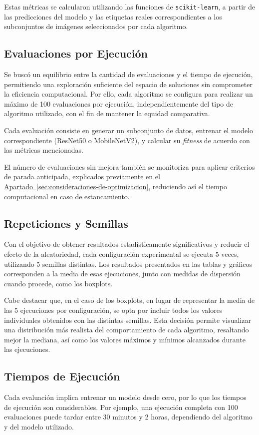 Estas métricas se calcularon utilizando las funciones de \texttt{scikit-learn}, a partir de las predicciones del modelo y las etiquetas
reales correspondientes a los subconjuntos de imágenes seleccionados por cada algoritmo.

\subsection{Evaluaciones por Ejecución}\label{sec:evaluaciones-por-ejecucion}
Se buscó un equilibrio entre la cantidad de evaluaciones y el tiempo de ejecución, permitiendo una exploración suficiente del espacio de soluciones sin comprometer la eficiencia computacional.
Por ello, cada algoritmo se configura para realizar un máximo de 100 evaluaciones por ejecución,
independientemente del tipo de algoritmo utilizado, con el fin de mantener la equidad comparativa.

Cada evaluación consiste en generar un subconjunto de datos, entrenar el modelo correspondiente (ResNet50 o MobileNetV2),
y calcular su \textit{fitness} de acuerdo con las métricas mencionadas.

El número de evaluaciones sin mejora también se monitoriza para aplicar criterios de parada anticipada,
explicados previamente en el \hyperref[sec:consideraciones-de-optimizacion]{Apartado~\ref*{sec:consideraciones-de-optimizacion}},
reduciendo así el tiempo computacional en caso de estancamiento.

\subsection{Repeticiones y Semillas}\label{sec:repeticiones-y-semillas}
Con el objetivo de obtener resultados estadísticamente significativos y reducir el efecto de la aleatoriedad,
cada configuración experimental se ejecuta 5 veces, utilizando 5 semillas distintas.
Los resultados presentados en las tablas y gráficos corresponden a la media de esas ejecuciones,
junto con medidas de dispersión cuando procede, como los boxplots.

Cabe destacar que, en el caso de los boxplots, en lugar de representar la media de las 5 ejecuciones por configuración,
se opta por incluir todos los valores individuales obtenidos con las distintas semillas.
Esta decisión permite visualizar una distribución más realista del comportamiento de cada algoritmo,
resaltando mejor la mediana, así como los valores máximos y mínimos alcanzados durante las ejecuciones.

\subsection{Tiempos de Ejecución}\label{sec:tiempos-de-ejecucion}
Cada evaluación implica entrenar un modelo desde cero, por lo que los tiempos de ejecución son considerables.
Por ejemplo, una ejecución completa con 100 evaluaciones puede tardar entre 30 minutos y 2 horas,
dependiendo del algoritmo y del modelo utilizado.

